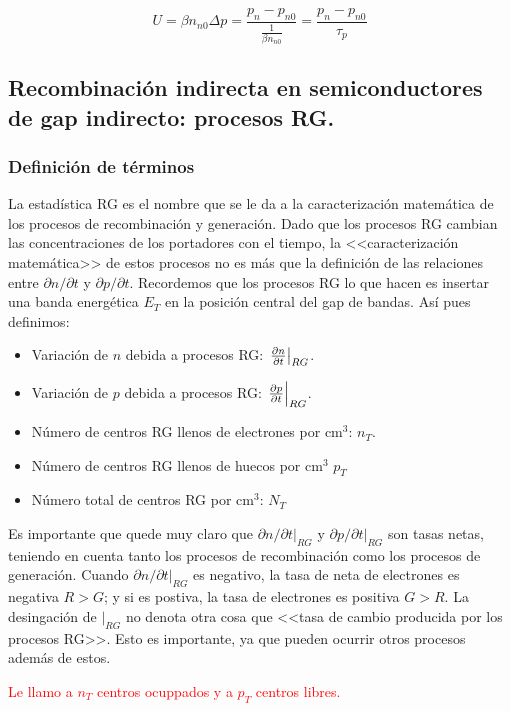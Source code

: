\begin{equation}
	U = \beta n_{n0}\Delta p = \frac{p_n - p_{n0}}{\frac{1}{\beta n_{n0}}} =  \frac{p_n - p_{n0}}{\tau_p}
\end{equation}

\subsection{Recombinación indirecta en semiconductores de gap indirecto: procesos RG.}

\subsubsection{Definición de términos}

La estadística RG es el nombre que se le da a la caracterización matemática de los procesos de recombinación y generación. Dado que los procesos RG cambian las concentraciones de los portadores con el tiempo, la <<caracterización matemática>> de estos procesos no es más que la definición de las relaciones entre $\partial n / \partial t$ y $\partial p / \partial t$. Recordemos que los procesos RG lo que hacen es insertar una banda energética $E_T$ en la posición central del gap de bandas. Así pues definimos:

\begin{itemize}
	\item Variación de $n$ debida a procesos RG: $\eval{\parciales{n}{t}}_{RG}$.
	\item Variación de $p$ debida a procesos RG: $\eval{\parciales{p}{t}}_{RG}$.
	\item Número de centros RG llenos de electrones por $\mathrm{cm}^3$: $n_T$.
	\item Número de centros RG llenos de huecos por $\mathrm{cm}^3$ $p_T$
	\item Número total de centros RG por $\mathrm{cm}^3$: $N_T$
\end{itemize}
Es importante que quede muy claro que $\partial n / \partial t |_{RG}$ y $\partial p / \partial t|_{RG} $ son tasas netas, teniendo en cuenta tanto los procesos de recombinación como los procesos de generación. Cuando $\partial n / \partial t|_{RG}$ es negativo, la tasa de neta de electrones es negativa $R>G$; y si es postiva, la tasa de electrones es positiva $G>R$. La desingación de $|_{RG}$ no denota otra cosa que <<tasa de cambio producida por los procesos RG>>. Esto es importante, ya que pueden ocurrir otros procesos además de estos.

\begin{Anotacion}
	\textcolor{red}{Le llamo a $n_T$ centros ocuppados y a $p_T$ centros libres.}
\end{Anotacion}

